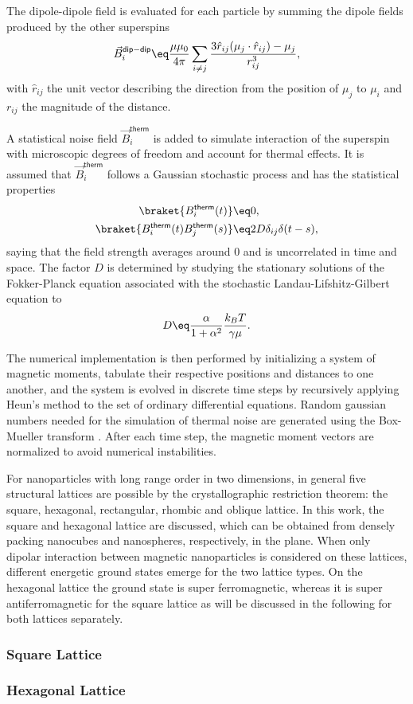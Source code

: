 \documentclass[\main/dresen_thesis.tex]{subfiles}
\begin{document}
  The dipole-dipole field is evaluated for each particle by summing the dipole fields produced by the other superspins
  \begin{align}
    \vec{B}^\mathsf{dip-dip}_i \eq \frac{\mu \mu_0}{4 \pi}  \sum_{i \neq j} \frac{3 \hat{r}_{ij}  (\mu_j \cdot \hat{r}_{ij}) - \mu_j}{r_{ij}^3},
  \end{align}
  with $\hat{r}_{ij}$ the unit vector describing the direction from the position of $\mu_j$ to $\mu_i$ and $r_{ij}$ the magnitude of the distance.

  A statistical noise field $\vec{B}^\mathsf{therm}_i$ is added to simulate interaction of the superspin with microscopic degrees of freedom and account for thermal effects.
  It is assumed that $\vec{B}^\mathsf{therm}_i$ follows a Gaussian stochastic process and has the statistical properties
  \begin{align}
    \braket{B^\mathsf{therm}_i (t)} &\eq 0,\\
    \braket{B^\mathsf{therm}_i (t) B^\mathsf{therm}_j (s)} &\eq 2 D \delta_{ij} \delta(t - s),
  \end{align}
  saying that the field strength averages around 0 and is uncorrelated in time and space.
  The factor $D$ is determined by studying the stationary solutions of the Fokker-Planck equation associated with the stochastic Landau-Lifshitz-Gilbert equation to \cite{Garcia_1998_Lange}
  \begin{align}
    D \eq \frac{\alpha}{1 + \alpha^2} \frac{k_B T}{\gamma \mu}.
  \end{align}

  The numerical implementation is then performed by initializing a system of magnetic moments, tabulate their respective positions and distances to one another, and the system is evolved in discrete time steps by recursively applying Heun's method \cite{Sueli_2003_Anint} to the set of ordinary differential equations.
  Random gaussian numbers needed for the simulation of thermal noise are generated using the Box-Mueller transform \cite{Box_1957_Anoteo}.
  After each time step, the magnetic moment vectors are normalized to avoid numerical instabilities.


  For nanoparticles with long range order in two dimensions, in general five structural lattices are possible by the crystallographic restriction theorem: the square, hexagonal, rectangular, rhombic and oblique lattice.
  In this work, the square and hexagonal lattice are discussed, which can be obtained from densely packing nanocubes and nanospheres, respectively, in the plane.
  When only dipolar interaction between magnetic nanoparticles is considered on these lattices, different energetic ground states emerge for the two lattice types.
  On the hexagonal lattice the ground state is super ferromagnetic, whereas it is super antiferromagnetic for the square lattice as will be discussed in the following for both lattices separately.

  \subsubsection{Square Lattice}
    

  \subsubsection{Hexagonal Lattice}
\end{document}
